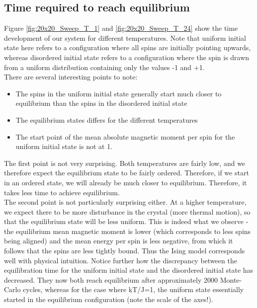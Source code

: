 \documentclass[a4paper, 10pt]{article}
\begin{document}
\subsection{Time required to reach equilibrium}\label{Discussion_time_for_eq}
Figure \ref{fig:20x20_Sweep_T_1} and \ref{fig:20x20_Sweep_T_24} show the time development of our system for different temperatures. Note that uniform initial state here refers to a configuration where all spins are initially pointing upwards, whereas disordered initial state refers to a configuration where the spin is drawn from a uniform distribution containing only the values -1 and +1.\\
\linebreak
There are several interesting points to note:
\begin{itemize}
\item The spins in the uniform initial state generally start much closer to equilibrium than the spins in the disordered initial state
\item The equilibrium states differs for the different temperatures
\item The start point of the mean absolute magnetic moment per spin for the uniform initial state is not at 1.
\end{itemize}
The first point is not very surprising. Both temperatures are fairly low, and we therefore expect the equilibrium state to be fairly ordered. Therefore, if we start in an ordered state, we will already be much closer to equilibrium. Therefore, it takes less time to achieve equilibrium. \\
\linebreak
The second point is not particularly surprising either. At a higher temperature, we expect there to be more disturbance in the crystal (more thermal motion), so that the equilibrium state will be less uniform. This is indeed what we observe - the equilibrium mean magnetic moment is lower (which corresponds to less spins being aligned) and the mean energy per spin is less negative, from which it follows that the spins are less tightly bound. Thus the Ising model corresponds well with physical intuition. Notice further how the discrepancy between the equilibration time for the uniform initial state and the disordered initial state has decreased. They now both reach equilibrium after approximately 2000 Monte-Carlo cycles, whereas for the case where kT/J=1, the uniform state essentially started in the equilibrium configuration (note the scale of the axes!).\\
\end{document}
